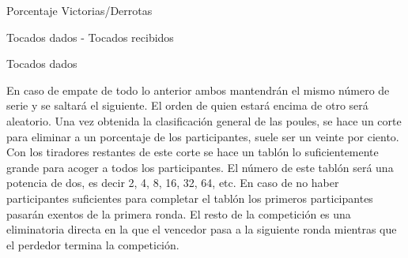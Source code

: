 \begin{compactenum}
  \item Porcentaje Victorias/Derrotas
  \item Tocados dados - Tocados recibidos
  \item Tocados dados
\end{compactenum}

En caso de empate de todo lo anterior ambos mantendrán el mismo número de serie y se saltará el siguiente. El orden de
 quien estará encima de otro será aleatorio. Una vez obtenida la clasificación general de las poules, se hace un corte
 para eliminar a un porcentaje de los participantes, suele ser un veinte por ciento. Con los tiradores restantes
 de este corte se hace un tablón lo suficientemente grande para acoger a todos los participantes. El número de este
 tablón será una potencia de dos, es decir 2, 4, 8, 16, 32, 64, etc. En caso de no haber participantes suficientes para completar
 el tablón los primeros participantes pasarán exentos de la primera ronda. El resto de la competición es una eliminatoria
 directa en la que el vencedor pasa a la siguiente ronda mientras que el perdedor termina la competición.
